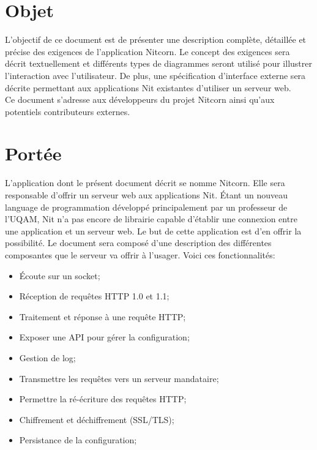 \documentclass{scrreprt}
\begin{document}
\section{Objet}
L'objectif de ce document est de présenter une description complète, détaillée et précise des exigences de l'application Nitcorn. Le concept des exigences sera décrit textuellement et différents types de diagrammes seront utilisé pour illustrer l'interaction avec l'utilisateur. De plus, une spécification d'interface externe sera décrite permettant aux applications Nit existantes d'utiliser un serveur web.\\

Ce document s'adresse aux développeurs du projet Nitcorn ainsi qu'aux potentiels
contributeurs externes.
\section{Portée}
L'application dont le présent document décrit se nomme Nitcorn. Elle sera responsable d'offrir un serveur web aux applications Nit. Étant un nouveau language de programmation développé principalement par un professeur de l'UQAM, Nit n'a pas encore de librairie capable d'établir une connexion entre une application et un serveur web. Le but de cette application est d'en offrir la possibilité. Le document sera composé d'une description des différentes composantes que le serveur va offrir à l'usager. Voici ces fonctionnalités:
\begin{itemize}
    \item Écoute sur un socket;
    \item Réception de requêtes HTTP 1.0 et 1.1;
    \item Traitement et réponse à une requête HTTP;
    \item Exposer une API pour gérer la configuration;
    \item Gestion de log;
    \item Transmettre les requêtes vers un serveur mandataire;
    \item Permettre la ré-écriture des requêtes HTTP;
    \item Chiffrement et déchiffrement (SSL/TLS);
    \item Persistance de la configuration;
\end{itemize}
\end{document}
